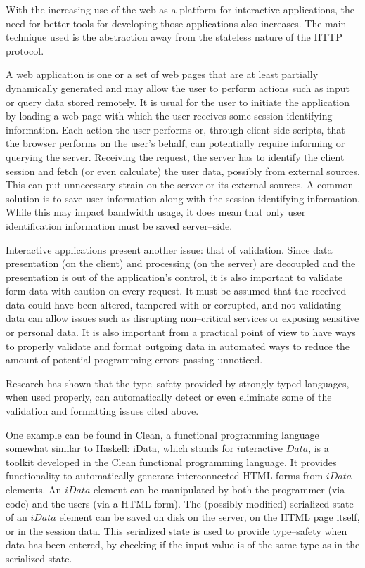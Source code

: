 With the increasing use of the web as a platform for interactive applications, the need for better tools for developing those applications also increases.
The main technique used is the abstraction away from the stateless nature of the HTTP protocol.

A web application is one or a set of web pages that are at least partially dynamically generated and may allow the user to perform actions such as input or query data stored remotely.
It is usual for the user to initiate the application by loading a web page with which the user receives some session identifying information.
Each action the user performs or, through client side scripts, that the browser performs on the user's behalf, can potentially require informing or querying the server.
Receiving the request, the server has to identify the client session and fetch (or even calculate) the user data, possibly from external sources.
This can put unnecessary strain on the server or its external sources. 
A common solution is to save user information along with the session identifying information.
While this may impact bandwidth usage, it does mean that only user identification information must be saved server--side.

Interactive applications present another issue: that of validation.
Since data presentation (on the client) and processing (on the server) are decoupled and the presentation is out of the application's control, it is also important to validate form data with caution on every request.
It must be assumed that the received data could have been altered, tampered with or corrupted, and not validating data can allow issues such as disrupting non--critical services or exposing sensitive or personal data.
It is also important from a practical point of view to have ways to properly validate and format outgoing data in automated ways to reduce the amount of potential programming errors passing unnoticed.

Research has shown that the type--safety provided by strongly typed languages, when used properly, can automatically detect or even eliminate some of the validation and formatting issues cited above. \cite{SEW}

One example can be found in Clean, a functional programming language somewhat similar to Haskell:
iData, which stands for $ i $nteractive $ Data $, is a toolkit developed in the Clean functional programming language.\cite{Plasmeijer06idatafor}
It provides functionality to automatically generate interconnected HTML forms from $ iData $ elements.
An $ iData $ element can be manipulated by both the programmer (via code) and the users (via a HTML form).
The (possibly modified) serialized state of an $ iData $ element can be saved on disk on the server, on the HTML page itself, or in the session data.
This serialized state is used to provide type--safety when data has been entered, by checking if the input value is of the same type as in the serialized state.

